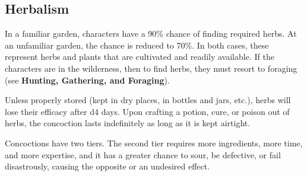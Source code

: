 \documentclass[twoside]{article}
\begin{document}
\subsection*{Herbalism}

In a familiar garden, characters have a 90\% chance of finding required herbs. At an unfamiliar garden, the chance is reduced to 70\%. In both cases, these represent herbs and plants that are cultivated and readily available. If the characters are in the wilderness, then to find herbs, they must resort to foraging (see \textbf{Hunting, Gathering, and Foraging}).

\bigbreak

Unless properly stored (kept in dry places, in bottles and jars, etc.), herbs will lose their efficacy after d4 days. Upon crafting a potion, cure, or poison out of herbs, the concoction lasts indefinitely as long as it is kept airtight.

\bigbreak

Concoctions have two tiers. The second tier requires more ingredients, more time, and more expertise, and it has a greater chance to sour, be defective, or fail disastrously, causing the opposite or an undesired effect.
\end{document}
